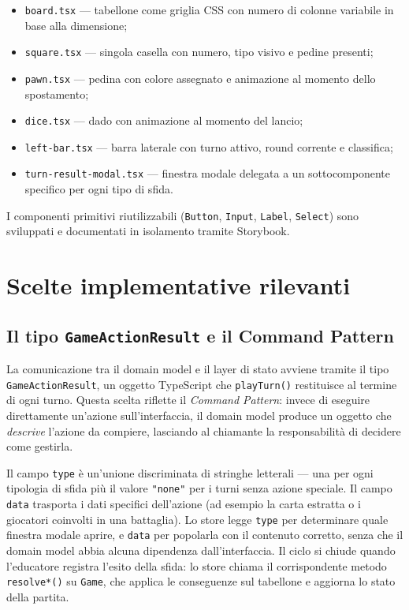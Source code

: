 \documentclass[12pt]{report}
\begin{document}
\begin{itemize}
    \item \texttt{board.tsx} --- tabellone come griglia CSS con numero di colonne variabile in base alla dimensione;
    \item \texttt{square.tsx} --- singola casella con numero, tipo visivo e pedine presenti;
    \item \texttt{pawn.tsx} --- pedina con colore assegnato e animazione al momento dello spostamento;
    \item \texttt{dice.tsx} --- dado con animazione al momento del lancio;
    \item \texttt{left-bar.tsx} --- barra laterale con turno attivo, round corrente e classifica;
    \item \texttt{turn-result-modal.tsx} --- finestra modale delegata a un sottocomponente specifico per ogni tipo di sfida.
\end{itemize}

I componenti primitivi riutilizzabili (\texttt{Button}, \texttt{Input}, \texttt{Label}, \texttt{Select}) sono sviluppati e documentati in isolamento tramite Storybook.

\section{Scelte implementative rilevanti}

\subsection{Il tipo \texttt{GameActionResult} e il Command Pattern}
\label{sec:command}

La comunicazione tra il domain model e il layer di stato avviene tramite il tipo \texttt{GameActionResult}, un oggetto TypeScript che \texttt{playTurn()} restituisce al termine di ogni turno.
Questa scelta riflette il \textit{Command Pattern}: invece di eseguire direttamente un'azione sull'interfaccia, il domain model produce un oggetto che \textit{descrive} l'azione da compiere, lasciando al chiamante la responsabilità di decidere come gestirla.

Il campo \texttt{type} è un'unione discriminata di stringhe letterali --- una per ogni tipologia di sfida più il valore \texttt{"none"} per i turni senza azione speciale. Il campo \texttt{data} trasporta i dati specifici dell'azione (ad esempio la carta estratta o i giocatori coinvolti in una battaglia). Lo store legge \texttt{type} per determinare quale finestra modale aprire, e \texttt{data} per popolarla con il contenuto corretto, senza che il domain model abbia alcuna dipendenza dall'interfaccia.
Il ciclo si chiude quando l'educatore registra l'esito della sfida: lo store chiama il corrispondente metodo \texttt{resolve*()} su \texttt{Game}, che applica le conseguenze sul tabellone e aggiorna lo stato della partita.
\end{document}
